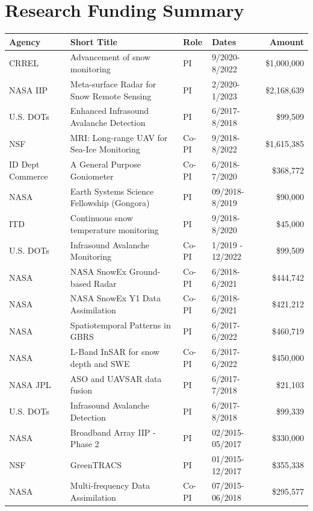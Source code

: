 \documentclass[11pt]{article}
\renewcommand\arraystretch{1}
\begin{document}
\begin{table}[!htbp]
\section*{Research Funding Summary}
\renewcommand\arraystretch{0.7}
  \centering
  \begin{tabular}{|l|l|l|l|r|}
\hline
\textbf{Agency} & \textbf{Short Title} & \textbf{Role} & \textbf{Dates} & \textbf{Amount} \\ \hline \hline
CRREL & Advancement of snow monitoring & PI & 9/2020-8/2022 & \$1,000,000 \\ \hline
NASA IIP & Meta-surface Radar for Snow Remote Sensing & PI & 2/2020-1/2023 & \$2,168,639 \\ \hline
U.S. DOTs & Enhanced Infrasound Avalanche Detection & PI & 6/2017-8/2018 &  \$99,509 \\ \hline
NSF & MRI: Long-range UAV for Sea-Ice Monitoring & Co-PI & 9/2018-8/2022 & \$1,615,385 \\ \hline
ID Dept Commerce & A General Purpose Goniometer & Co-PI & 6/2018-7/2020 & \$368,772 \\ \hline
NASA & Earth Systems Science Fellowship (Gongora) & PI & 09/2018-8/2019 & \$90,000 \\ \hline
ITD & Continuous snow temperature monitoring & PI & 9/2018-8/2020 & \$45,000 \\ \hline
U.S. DOTs & Infrasound Avalanche Monitoring & Co-PI & 1/2019 - 12/2022 & \$99,509 \\ \hline
NASA & NASA SnowEx Ground-based Radar & Co-PI & 6/2018-6/2021 &  \$444,742 \\ \hline
NASA & NASA SnowEx Y1 Data Assimilation & Co-PI & 6/2018-6/2021 &  \$421,212 \\ \hline
NASA & Spatiotemporal Patterns in GBRS & PI & 6/2017-6/2022 & \$460,719 \\ \hline
NASA & L-Band InSAR for snow depth and SWE & Co-PI & 6/2017-6/2022 & \$450,000 \\ \hline
NASA JPL & ASO and UAVSAR data fusion & PI &  6/2017-7/2018 & \$21,103 \\ \hline
U.S. DOTs & Infrasound Avalanche Detection & PI & 6/2017-8/2018 &  \$99,339 \\ \hline
NASA & Broadband Array IIP - Phase 2 & PI & 02/2015-05/2017 & \$330,000 \\ \hline
NSF & GreenTRACS & PI & 01/2015-12/2017 & \$355,338 \\ \hline
NASA & Multi-frequency Data Assimilation & Co-PI & 07/2015-06/2018 & \$295,577 \\ \hline

\end{tabular}
\end{table}
\end{document}
